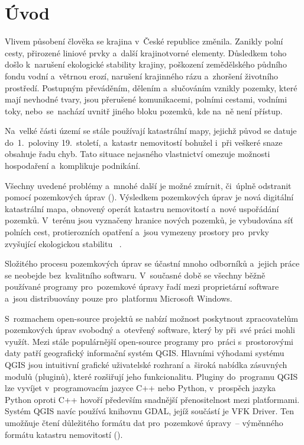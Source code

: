\chapter{Úvod}
\label{1-uvod}

Vlivem působení člověka se krajina v~České republice změnila. Zanikly
polní cesty, přirozené liniové prvky a~další krajinotvorné
elementy. Důsledkem toho došlo k~naru\-šení ekologické stability
krajiny, poškození zemědělského půdního fondu vodní a~vě\-trnou erozí,
narušení krajinného rázu a~zhoršení životního prostředí. Postupným
převáděním, dělením a~slučováním vznikly pozemky, které mají nevhodné
tvary, jsou přerušené komunikacemi, polními cestami, vodními toky,
nebo~se~nachází uvnitř jiného bloku pozemků, kde na~ně není přístup.

Na~velké části území se stále používají katastrální mapy, jejichž
původ se datuje do~1.~poloviny 19.~století, a~katastr nemovitostí
bohužel i~při veškeré snaze obsahuje řadu chyb. Tato situace nejasného
vlastnictví omezuje možnosti hospodaření a~komplikuje podnikání.

Všechny uvedené problémy a~mnohé další je možné zmírnit, či~úplně
odstranit pomocí pozemkových úprav (). Výsledkem pozemkových
úprav je nová digi\-tální katastrální mapa, obnovený operát katastru
nemovitostí a~nové uspořádání pozemků. V~terénu jsou vyznačeny hranice
nových pozemků, je vybudována síť polních cest, protierozních opatření
a~jsou vymezeny prostory pro~prvky zvyšující ekologickou
stabilitu~\citep{pu_cr} \citep{pu_skripta}.

Složitého procesu pozemkových úprav se účastní mnoho odborníků
a~jejich práce se neobejde bez~kvalitního softwaru. V~současné době se
všechny běžně používané programy pro~pozemkové úpravy řadí mezi
proprietární software a~jsou distribuovány pouze pro~platformu Microsoft
Windows.

S~rozmachem open-source projektů se nabízí možnost poskytnout
zpracovatelům pozemkových úprav svobodný a~otevřený software, který by
při~své práci mohli využít. Mezi stále populárnější open-source
programy pro~práci s~prostorovými daty patří geografický informační
systém QGIS. Hlavními výhodami systému QGIS jsou intuitivní grafické
uživatelské rozhraní a~široká nabídka zásuvných modulů (plu\-ginů),
které rozšiřují jeho funkcionalitu. Pluginy do~programu QGIS lze
vyvíjet v~programovacím jazyce C++ nebo Python, v~prospěch jazyka
Python oproti C++ ho\-voří především snadnější přenositelnost mezi
platformami. Systém QGIS navíc používá knihovnu GDAL, jejíž součástí
je VFK Driver. Ten umožňuje čtení důležitého formátu dat pro~pozemkové
úpravy~– výměnného formátu katastru nemovitostí ().

